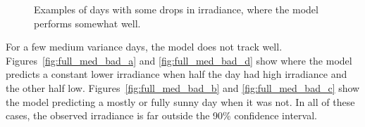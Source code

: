 {\begin{figure}
    \qquad
    \qquad
    \caption{Examples of days with some drops in irradiance, where the model performs somewhat well.
    \label{fig:full_med_med}}
\end{figure}
\clearpage
}

For a few medium variance days, the model does not track well. Figures~\ref{fig:full_med_bad_a} and \ref{fig:full_med_bad_d} show where the model predicts a constant lower irradiance when half the day had high irradiance and the other half low. Figures~\ref{fig:full_med_bad_b} and \ref{fig:full_med_bad_c} show the model predicting a mostly or fully sunny day when it was not. In all of these cases, the observed irradiance is far outside the 90\% confidence interval.

